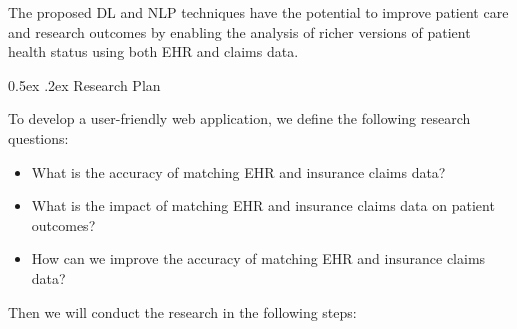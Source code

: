 \documentclass[11pt,]{article}
\makeatletter
\providecommand{\tightlist}{%
  \setlength{\itemsep}{0pt}\setlength{\parskip}{0pt}}
\renewcommand\subsection{
  \@startsection{subsection}{2}{\z@}
    {-1.5ex\@plus -1ex \@minus -.2ex}%
    {0.5ex \@plus .2ex}%
    {\normalfont\normalsize\bf}} %
\makeatother
\begin{document}
The proposed DL and NLP techniques have the potential to improve patient
care and research outcomes by enabling the analysis of richer versions
of patient health status using both EHR and claims data.

\subsection{Research Plan}\label{research-plan}

To develop a user-friendly web application, we define the following
research questions:

\begin{itemize}
\tightlist
\item
  What is the accuracy of matching EHR and insurance claims data?
\item
  What is the impact of matching EHR and insurance claims data on
  patient outcomes?
\item
  How can we improve the accuracy of matching EHR and insurance claims
  data?
\end{itemize}

Then we will conduct the research in the following steps:
\end{document}
